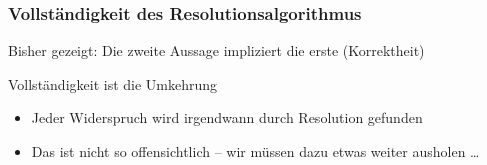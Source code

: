 \documentclass[aspectratio=1610,onlymath]{beamer}
\begin{document}
\begin{frame}\frametitle{Vollständigkeit des Resolutionsalgorithmus}


Bisher gezeigt: Die zweite Aussage impliziert die erste (\alert{Korrektheit})\bigskip

\alert{Vollständigkeit} ist die Umkehrung
\begin{itemize}
\item Jeder Widerspruch wird irgendwann durch Resolution gefunden
\item Das ist nicht so offensichtlich -- wir müssen dazu etwas weiter ausholen \ldots
\end{itemize}

\end{frame}

\bgroup
{}
\end{document}
